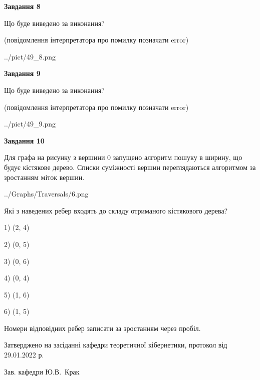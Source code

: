 \documentclass[12pt, ukrainian]{article}
\begin{document}
{\begin {large}
{\begin {center}\textbf{Завдання 8}\end {center}}\par
Що буде виведено за виконання?\par
 (повідомлення інтерпретатора про помилку позначати error)\par
\begin{center}
	{../pict/49_8.png}
\end{center}
\newpage

{\begin {center}\textbf{Завдання 9}\end {center}}\par
Що буде виведено за виконання?\par
 (повідомлення інтерпретатора про помилку позначати error)\par
\begin{center}
	{../pict/49_9.png}
\end{center}
\newpage

{\begin {center}\textbf{Завдання 10}\end {center}}\par
Для графа на рисунку з вершини 0 запущено алгоритм пошуку в ширину, що будує кістякове дерево. Списки суміжності вершин переглядаються алгоритмом за зростанням міток вершин.\par
\begin{center}
	{../Graphs/Traversals/6.png}
\end{center}
\par Які з наведених ребер входять до складу отриманого кістякового дерева?\par
1) (2, 4)\par
2) (0, 5)\par
3) (0, 6)\par
4) (0, 4)\par
5) (1, 6)\par
6) (1, 5)\par
{\vskip 15pt} Номери відповідних ребер записати за зростанням через пробіл.\par
\newpage


\end {large}
}
{\smallskip \begin {small} Затверджено на засіданні кафедри теоретичної кібернетики, протокол  від   29.01.2022 р.\par\smallskip\smallskip
{\parbox {6.5 cm}{Зав. кафедри \dotfill Ю.В.~Крак}} \end{small}}
\end{document}
